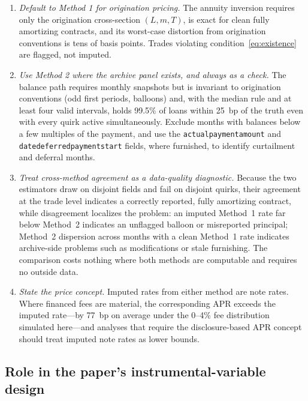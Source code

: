 \begin{enumerate}
\item \emph{Default to Method 1 for origination pricing.} The annuity inversion requires only the origination cross-section $(L, m, T)$, is exact for clean fully amortizing contracts, and its worst-case distortion from origination conventions is tens of basis points. Trades violating condition~\eqref{eq:existence} are flagged, not imputed.
\item \emph{Use Method 2 where the archive panel exists, and always as a check.} The balance path requires monthly snapshots but is invariant to origination conventions (odd first periods, balloons) and, with the median rule and at least four valid intervals, holds 99.5\% of loans within 25~bp of the truth even with every quirk active simultaneously. Exclude months with balances below a few multiples of the payment, and use the \texttt{actual\allowbreak payment\allowbreak amount} and \texttt{date\allowbreak deferred\allowbreak payment\allowbreak start} fields, where furnished, to identify curtailment and deferral months.
\item \emph{Treat cross-method agreement as a data-quality diagnostic.} Because the two estimators draw on disjoint fields and fail on disjoint quirks, their agreement at the trade level indicates a correctly reported, fully amortizing contract, while disagreement localizes the problem: an imputed Method~1 rate far below Method~2 indicates an unflagged balloon or misreported principal; Method~2 dispersion across months with a clean Method~1 rate indicates archive-side problems such as modifications or stale furnishing. The comparison costs nothing where both methods are computable and requires no outside data.
\item \emph{State the price concept.} Imputed rates from either method are note rates. Where financed fees are material, the corresponding APR exceeds the imputed rate---by 77~bp on average under the 0--4\% fee distribution simulated here---and analyses that require the disclosure-based APR concept should treat imputed note rates as lower bounds.
\end{enumerate}

\subsection{Role in the paper's instrumental-variable design}

